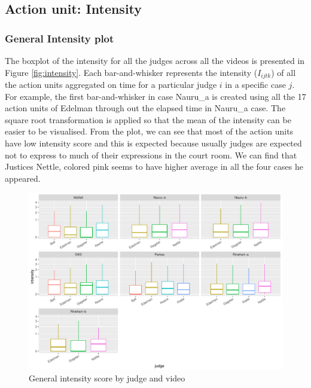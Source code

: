 \documentclass{monashthesis}
\begin{document}
\hypertarget{action-unit-intensity}{%
\subsection{Action unit: Intensity}\label{action-unit-intensity}}

\hypertarget{general-intensity-plot}{%
\subsubsection{General Intensity plot}\label{general-intensity-plot}}

The boxplot of the intensity for all the judges across all the videos is presented in Figure \ref{fig:intensity}. Each bar-and-whisker represents the intensity (\(I_{ijtk}\)) of all the action units aggregated on time for a particular judge \(i\) in a specific case \(j\). For example, the first bar-and-whisker in case Nauru\_a is created using all the 17 action units of Edelman through out the elapsed time in Nauru\_a case. The square root transformation is applied so that the mean of the intensity can be easier to be visualised. From the plot, we can see that most of the action units have low intensity score and this is expected because usually judges are expected not to express to much of their expressions in the court room. We can find that Justices Nettle, colored pink seems to have higher average in all the four cases he appeared.

\begin{figure}

{\centering \includegraphics[width=1\linewidth]{figures/intensity-boxplot-1} 

}

\caption{General intensity score by judge and video\label{fig:intensity}}\label{fig:intensity-boxplot}
\end{figure}
\end{document}
